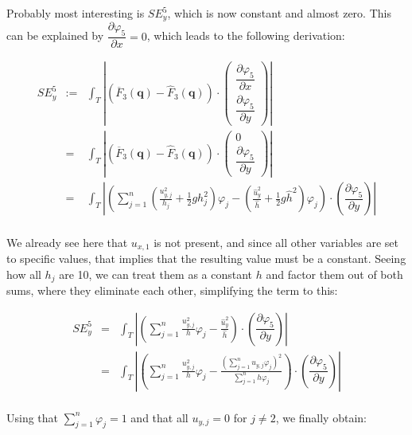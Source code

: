 \documentclass{article}
\newcommand{\pd}[2]{\dfrac{\partial #1}{\partial #2}}
\renewcommand{\phi}{\varphi}
\begin{document}
Probably most interesting is $SE_y^5$, which is now constant and almost zero. This can be explained by $\pd{\phi_5}{x}=0$, which leads to the following derivation:

\begin{eqnarray*}
  SE_y^5 & := & \int_T \left| \left(\overline{F}_3\left(\mathbf{q}\right) - \widehat{F}_3\left(\mathbf{q}\right)\right) \cdot \begin{pmatrix}\pd{\phi_5}{x} \\ \pd{\phi_5}{y}\end{pmatrix}\right| \\
  {} & = & \int_T \left| \left(\overline{F}_3\left(\mathbf{q}\right) - \widehat{F}_3\left(\mathbf{q}\right)\right) \cdot \begin{pmatrix}0 \\ \pd{\phi_5}{y}\end{pmatrix}\right| \\
  {} & = & \int_T \left| \left( \sum_{j=1}^n \left(\frac{u_{y,j}^2}{h_j} + \frac{1}{2} g h_j^2\right) \phi_j - \left( \frac{\widehat{u}_y^2}{\widehat{h}} + \frac{1}{2} g \widehat{h}^2 \right) \phi_j \right) \cdot \left(\pd{\phi_5}{y}\right) \right| \\
\end{eqnarray*}

We already see here that $u_{x,1}$ is not present, and since all other variables are set to specific values, that implies that the resulting value must be a constant. Seeing how all $h_j$ are 10, we can treat them as a constant $h$ and factor them out of both sums, where they eliminate each other, simplifying the term to this:

\begin{eqnarray*}
  SE_y^5 & = & \int_T \left| \left( \sum_{j=1}^n \frac{u_{y,j}^2}{h} \phi_j - \frac{\widehat{u}_y^2}{\widehat{h}} \right) \cdot \left(\pd{\phi_5}{y}\right) \right| \\
  {} & = & \int_T \left| \left( \sum_{j=1}^n \frac{u_{y,j}^2}{h} \phi_j - \frac{\left(\sum_{j=1}^n u_{y,j}\phi_j\right)^2}{\sum_{j=1}^n h\phi_j} \right) \cdot \left(\pd{\phi_5}{y}\right) \right| \\
\end{eqnarray*}

Using that $\sum_{j=1}^n \phi_j = 1$ and that all $u_{y,j} = 0$ for $j \neq 2$, we finally obtain:
\end{document}
